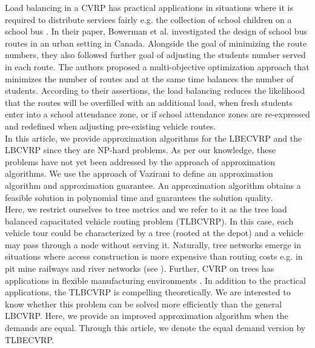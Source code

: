 \indent Load balancing in a CVRP has practical applications in situations where it is required to distribute services fairly e.g. the collection of school children on a school bus \cite{Bowerman}. In their paper, Bowerman et al. \cite{Bowerman} investigated the design of school bus routes in an urban setting in Canada. Alongside the goal of minimizing the route numbers, they also followed further goal of adjusting the students number served in each route. The authors proposed a multi-objective optimization approach that minimizes the number of routes and at the same time balances the number of students. According to their assertions, the load balancing reduces the likelihood that the routes will be overfilled with an additional load, when fresh students enter into a school attendance zone, or if school attendance zones are re-expressed and redefined when adjusting pre-existing vehicle routes. \\
\indent In this article, we provide approximation algorithms for the LBECVRP and the LBCVRP since they are NP-hard problems. As per our knowledge, these problems have not yet been addressed by the approach of approximation algorithms. We use the approach of Vazirani \cite{Vazirani} to define an approximation algorithm and approximation guarantee. An approximation algorithm obtains a feasible solution in polynomial time and guarantees the solution quality.   \\
\indent Here, we restrict ourselves to tree metrics and we refer to it as the tree load balanced capacitated vehicle routing problem (TLBCVRP). In this case, each vehicle tour could be characterized by a tree (rooted at the depot) and a vehicle may pass through a node without serving it. Naturally, tree networks emerge in situations where access construction is more expensive than routing costs e.g. in pit mine railways and river networks (see \cite{Basnet,Labbe}). Further, CVRP on trees has applications in flexible manufacturing environments \cite{Berger}. In addition to the practical applications, the TLBCVRP is compelling theoretically. We are interested to know whether this problem can be solved more efficiently than the general LBCVRP. Here, we provide an improved approximation algorithm when the demands are equal. Through this article, we denote the equal demand version by TLBECVRP.
